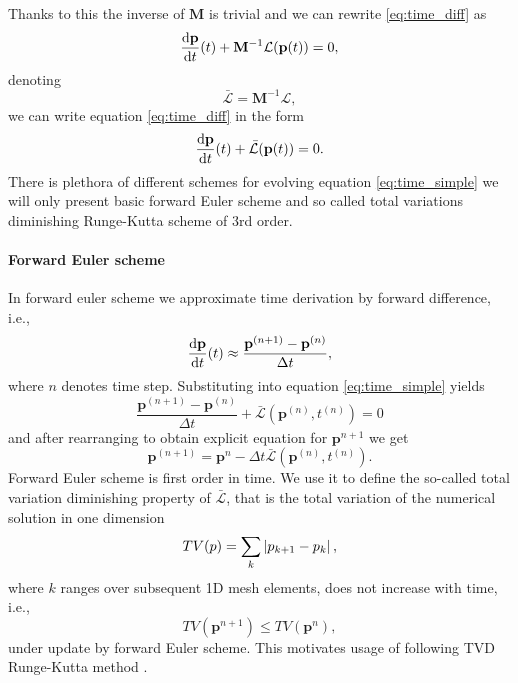 Thanks to this the inverse of $\mathbf{M}$ is trivial and we can rewrite 
\eqref{eq:time_diff} as
\begin{equation}
\frac{\text{d}\mathbf{p}}{\text{d}t}(t) + \mathbf{M}^{-1}\mathcal{L}(\mathbf{p}(t)) = 0,
\end{equation}
denoting
\begin{equation}
\bar{\mathcal{L}} =\mathbf{M}^{-1}\mathcal{L}, 
\end{equation}
we can write equation 
\eqref{eq:time_diff} in the form
\begin{equation}\label{eq:time_simple}
\frac{\text{d}\mathbf{p}}{\text{d}t}(t) + \bar{\mathcal{L}}(\mathbf{p}(t)) = 0.
\end{equation}
There is plethora of different schemes for evolving equation 
\eqref{eq:time_simple} we will only present basic forward Euler scheme and so called 
total variations diminishing Runge-Kutta scheme of 3rd order.


\paragraph{Forward Euler scheme} In forward euler scheme we approximate time 
derivation by forward difference, i.e.,
\begin{equation}
\frac{\text{d}\mathbf{p}}{\text{d}t}(t) \approx \frac{\mathbf{p}^{(n + 1)} - \mathbf{p}^{(n)}}{\Delta t},
\end{equation}
where $n$ denotes time step. Substituting into equation \eqref{eq:time_simple} 
yields
\begin{equation}
\frac{\mathbf{p}^{(n + 1)} - \mathbf{p}^{(n)}}{\Delta t} + 
\bar{\mathcal{L}}(\mathbf{p}^{(n)}, t^{(n)}) = 0
\end{equation}
and after rearranging to obtain explicit equation for $\mathbf{p}^{n + 1}$ we 
get
\begin{equation}
\mathbf{p}^{(n + 1)} = \mathbf{p}^{n} - {\Delta t} 
\bar{\mathcal{L}}(\mathbf{p}^{(n)}, t^{(n)}).
\end{equation}
Forward Euler scheme is first order in time. We use it to define the so-called 
total variation diminishing property of $\bar{\mathcal{L}}$, that is the total 
variation of the numerical solution in one dimension
\begin{equation}
\label{eq:TV}
TV(p) = \sum_{k} \left\lvert p_{k + 1} - p_{k}\right\rvert,    
\end{equation}
where $k$ ranges over subsequent 1D mesh elements, does not increase with time, i.e.,
\begin{equation}
TV(\mathbf{p}^{n + 1}) \leq TV(\mathbf{p}^{n}),
\end{equation}
under update by forward Euler scheme.
This motivates usage of following TVD Runge-Kutta method \cite[p. 73]{Gottlieb2002}. 




